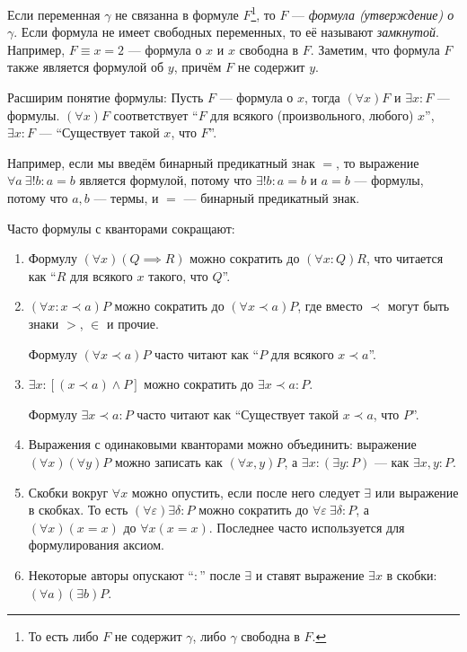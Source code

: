 Если переменная $\gamma$
не связанна в формуле $F$\footnote{
	То есть либо $F$ не содержит $\gamma$, либо $\gamma$ свободна в $F$.
}, то $F$ --- {\it формула (утверждение) о} $\gamma$. Если формула не имеет
свободных переменных, то её называют {\it замкнутой}.
Например, $F\equiv x=2$ --- формула о $x$ и $x$ свободна в $F$.
Заметим, что формула $F$ также является формулой об $y$, причём $F$ не содержит $y$.

Расширим понятие формулы: Пусть $F$ --- формула о $x$, тогда ${(\forall x)F}$
и ${\exists x:F}$ --- формулы. $(\forall x)F$ соответствует
``$F$ для всякого (произвольного, любого) $x$'', $\exists x:F$ ---
``Существует такой $x$, что $F$''.

Например, если мы введём бинарный предикатный знак $=$, то выражение
$\forall a~\exists!b:a=b$ является формулой, потому что ${\exists! b:a=b}$ и
${a=b}$ --- формулы, потому что $a,b$ --- термы, и $=$ --- бинарный предикатный знак.

Часто формулы с кванторами сокращают:
\begin{fullwidth}
	\begin{multicols}{2}
		\begin{enumerate}
			\item{}Формулу ${(\forall x)(Q\implies R)}$ можно сократить
			до ${(\forall x:Q)R}$, что читается как ``$R$ для всякого $x$ такого,
			что $Q$''.

			\item{}${(\forall x:x\prec a)P}$ можно сократить до ${(\forall x\prec a)P}$,
			где вместо $\prec$ могут быть знаки $>$, $\in$ и прочие.

			Формулу ${(\forall x\prec a)P}$ часто читают как
			``$P$ для всякого $x\prec a$''.

			\item{}$\exists x:[(x\prec a)\land P]$ можно сократить
			до $\exists x\prec a:P$.

			Формулу ${\exists x\prec a:P}$ часто читают как
			``Существует такой $x\prec a$, что $P$''.

			\columnbreak

			\item{}Выражения с одинаковыми кванторами можно объединить:
			выражение $(\forall x)(\forall y)P$ можно записать как $(\forall x,y)P$,
			а ${\exists x:(\exists y:P)}$ --- как $\exists x,y:P$.

			\item{}Скобки вокруг $\forall x$ можно опустить,
			если после него следует $\exists$ или выражение в скобках.
			То есть ${(\forall \varepsilon)\exists \delta:P}$
			можно сократить до $\forall \varepsilon~\exists \delta:P$,
			а $(\forall x)(x=x)$ до $\forall x(x=x)$.
			Последнее часто используется для формулирования аксиом.

			\item{}Некоторые авторы опускают ``$:$'' после $\exists$ и
			ставят выражение $\exists x$ в скобки: $(\forall a)(\exists b)P$.
		\end{enumerate}
	\end{multicols}
\end{fullwidth}

